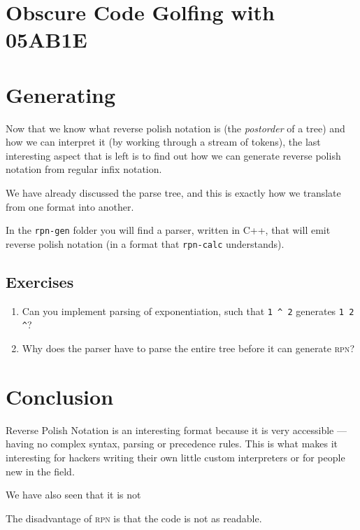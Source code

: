 \documentclass[a4paper,twocolumn]{article}
\begin{document}
\section{Obscure Code Golfing with 05AB1E}



\section{Generating}

Now that we know what reverse polish notation is (the \emph{postorder} of a tree) and how we can interpret it (by working through a stream of tokens), the last interesting aspect that is left is to find out how we can generate reverse polish notation from regular infix notation. 

We have already discussed the parse tree, and this is exactly how we translate from one format into another.

In the \verb|rpn-gen| folder you will find a parser, written in C++, that will emit reverse polish notation (in a format that \verb|rpn-calc| understands). 

\subsection*{Exercises}

\begin{enumerate}
  \item Can you implement parsing of exponentiation, such that \verb|1 ^ 2| generates \verb|1 2 ^|?
  \item Why does the parser have to parse the entire tree before it can generate \textsc{rpn}?
\end{enumerate}

\section{Conclusion}

Reverse Polish Notation is an interesting format because it is very accessible — having no complex syntax, parsing or precedence rules. This is what makes it interesting for hackers writing their own little custom interpreters or for people new in the field.

We have also seen that it is not 

The disadvantage of \textsc{rpn} is that the code is not as readable.

\printbibliography
\end{document}
